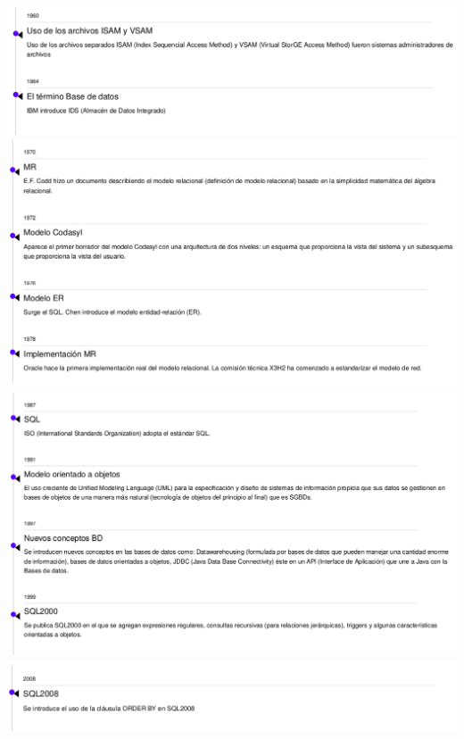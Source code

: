 \documentclass[12pt]{article}
\begin{document}
\begin{enumerate}[a. ]
                  \includegraphics[width=\textwidth]{imagenes/parte1.png}
                  \includegraphics[width=\textwidth]{imagenes/parte2.png}
                  \includegraphics[width=\textwidth]{imagenes/parte3.png}
                  \includegraphics[width=\textwidth]{imagenes/parte4.png}



\end{enumerate}
\end{document}
